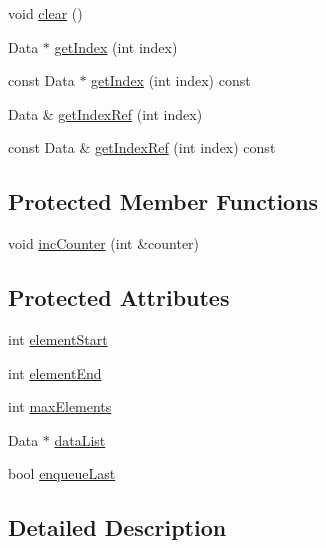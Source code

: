 \begin{CompactItemize}
void \hyperlink{class_j_g_t_l_1_1_circular_buffer_interface_edb3d8c798008fada3320b2c4beba43e}{clear} ()
\item 
Data $\ast$ \hyperlink{class_j_g_t_l_1_1_circular_buffer_interface_96e8cf943fc910b705845bf25e914a2c}{get\-Index} (int index)
\item 
const Data $\ast$ \hyperlink{class_j_g_t_l_1_1_circular_buffer_interface_d142cb2356d7d40e8dad0d246414a862}{get\-Index} (int index) const
\item 
Data \& \hyperlink{class_j_g_t_l_1_1_circular_buffer_interface_3bcda10a314fbebd028ec4f7f6d536e7}{get\-Index\-Ref} (int index)
\item 
const Data \& \hyperlink{class_j_g_t_l_1_1_circular_buffer_interface_526ca43f4de0be8d85f5109cee59ebd1}{get\-Index\-Ref} (int index) const
\end{CompactItemize}
\subsection*{Protected Member Functions}
\begin{CompactItemize}
\item 
void \hyperlink{class_j_g_t_l_1_1_circular_buffer_interface_e16b6f41d64ab1d0910963aca895aeac}{inc\-Counter} (int \&counter)
\end{CompactItemize}
\subsection*{Protected Attributes}
\begin{CompactItemize}
\item 
int \hyperlink{class_j_g_t_l_1_1_circular_buffer_interface_e12ae36ffa557c4ea92619e1c9c50651}{element\-Start}
\item 
int \hyperlink{class_j_g_t_l_1_1_circular_buffer_interface_f55d56fa3037131a08b902f18fbbfbc7}{element\-End}
\item 
int \hyperlink{class_j_g_t_l_1_1_circular_buffer_interface_467700eb226ee9291302b4ad0c9ffcc7}{max\-Elements}
\item 
Data $\ast$ \hyperlink{class_j_g_t_l_1_1_circular_buffer_interface_c23df3b62ea0bf222df5bcf65486e874}{data\-List}
\item 
bool \hyperlink{class_j_g_t_l_1_1_circular_buffer_interface_b7397cb8c8d70d7672fb23bbb451bdef}{enqueue\-Last}
\end{CompactItemize}


\subsection{Detailed Description}
